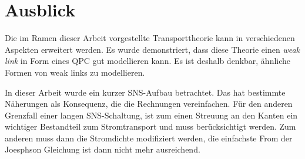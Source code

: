 \section{Ausblick}

Die im Ramen dieser Arbeit vorgestellte Transporttheorie kann in verschiedenen Aspekten erweitert werden. Es wurde demonstriert, dass diese Theorie einen \emph{weak link} in Form eines QPC gut modellieren kann. Es ist deshalb denkbar, \"ahnliche Formen von weak links zu modellieren.

In dieser Arbeit wurde ein kurzer SNS-Aufbau betrachtet. Das hat bestimmte N\"aherungen als Konsequenz, die die Rechnungen vereinfachen. F\"ur den anderen Grenzfall einer langen SNS-Schaltung, ist zum einen Streuung an den Kanten ein wichtiger Bestandteil zum Stromtransport und muss ber\"ucksichtigt werden. Zum anderen muss dann die Stromdichte modifiziert werden, die einfachste From der Joesphson Gleichung ist dann nicht mehr ausreichend.






